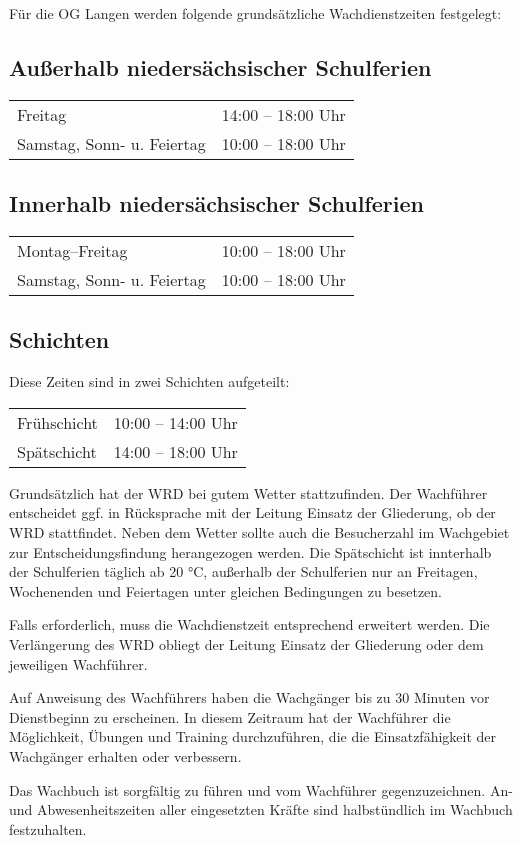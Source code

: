 Für die OG Langen werden folgende grundsätzliche Wachdienstzeiten festgelegt:

\subsection*{Außerhalb niedersächsischer Schulferien}
\begin{tabular}{lr}
Freitag  & 14:00 -- 18:00 Uhr\\
Samstag, Sonn- u. Feiertag & 10:00 -- 18:00 Uhr
\end{tabular}
\subsection*{Innerhalb niedersächsischer Schulferien}
\begin{tabular}{lr}
Montag--Freitag & 10:00 -- 18:00 Uhr\\
Samstag, Sonn- u. Feiertag & 10:00 -- 18:00 Uhr
\end{tabular}
\subsection*{Schichten}
Diese Zeiten sind in zwei Schichten aufgeteilt:\\
\begin{tabular}{lr}
Frühschicht   & 10:00 -- 14:00 Uhr\\
Spätschicht   & 14:00 -- 18:00 Uhr
\end{tabular}

Grundsätzlich hat der WRD bei gutem Wetter stattzufinden. Der Wachführer entscheidet ggf. in Rücksprache mit der Leitung Einsatz der Gliederung, ob der WRD stattfindet. Neben dem Wetter sollte auch die Besucherzahl im Wachgebiet zur Entscheidungsfindung herangezogen werden. Die Spätschicht ist innterhalb der Schulferien täglich ab 20 °C, außerhalb der Schulferien nur an Freitagen, Wochenenden und Feiertagen unter gleichen Bedingungen zu besetzen.

Falls erforderlich, muss die Wachdienstzeit entsprechend erweitert werden. Die Verlängerung des WRD obliegt der Leitung Einsatz der Gliederung oder dem jeweiligen Wachführer.

Auf Anweisung des Wachführers haben die Wachgänger bis zu 30 Minuten vor Dienstbeginn zu erscheinen. In diesem Zeitraum hat der Wachführer die Möglichkeit, Übungen und Training durchzuführen, die die Einsatzfähigkeit der Wachgänger erhalten oder verbessern.


Das Wachbuch ist sorgfältig zu führen und vom Wachführer gegenzuzeichnen. An- und Abwesenheitszeiten aller eingesetzten Kräfte sind halbstündlich im Wachbuch festzuhalten.

